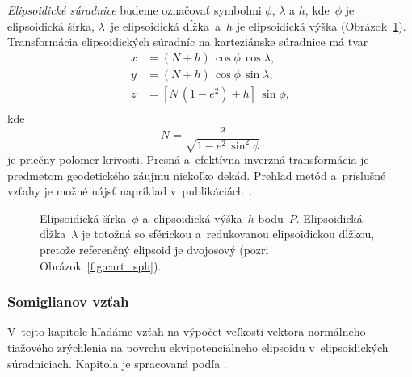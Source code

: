 \documentclass[a4paper,12pt]{book}
\begin{document}
\emph{Elipsoidické súradnice} budeme označovať symbolmi $\phi$, $\lambda$ 
a $h$, kde~$\phi$ je elipsoidická šírka, $\lambda$~je elipsoidická dĺžka~a~$h$ 
je elipsoidická výška (Obrázok~\ref{fig:ell_coords}).  Transformácia 
elipsoidických súradníc na karteziánske súradnice má tvar 
\parencite{MoritzPhysicalGeodesy}
%
\begin{equation}
\begin{split}
x &= (N + h) \, \cos\phi \, \cos\lambda{,}\\
y &= (N + h) \, \cos\phi \, \sin\lambda{,}\\
z &= \left[ N \, (1 - e^2) + h \right] \, \sin\phi{,}\\
\end{split}
\end{equation}
%
kde
%
\begin{equation}
N = \frac{a}{\sqrt{1 - e^2 \, \sin^2\phi}}
\end{equation}
%
je priečny polomer krivosti.  Presná a~efektívna inverzná transformácia je 
predmetom geodetického záujmu niekoľko dekád.  Prehľad metód a~príslušné vzťahy 
je možné nájsť napríklad v~publikáciách~\textcite{Fukushima2006,Claessens2019}.

\begin{figure}[bt]
\centering

\caption{Elipsoidická šírka~$\phi$ a~elipsoidická výška~$h$ bodu~$P$.  
Elipsoidická dĺžka~$\lambda$ je totožná so sférickou a~redukovanou 
elipsoidickou dĺžkou, pretože referenčný elipsoid je dvojosový (pozri 
Obrázok~\ref{fig:cart_sph}).}
\label{fig:ell_coords}
\end{figure}

\subsubsection{Somiglianov vzťah}
\label{sec:somigliana}

V~tejto kapitole hľadáme vzťah na výpočet veľkosti vektora normálneho tiažového 
zrýchlenia na povrchu ekvipotenciálneho elipsoidu v~elipsoidických 
súradniciach.  Kapitola je spracovaná podľa \textcite{MoritzPhysicalGeodesy}.
\end{document}
